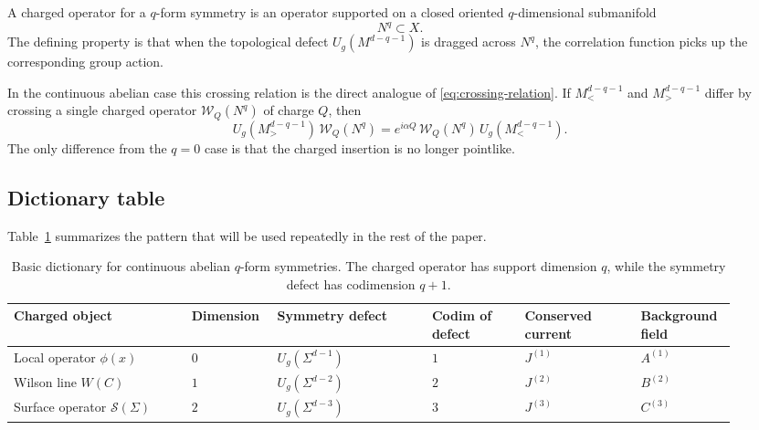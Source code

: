\begin{definition}\label{def:qdim-operator}
A charged operator for a $q$-form symmetry is an operator supported on a closed oriented $q$-dimensional submanifold
\begin{equation*}
N^q\subset X.
\end{equation*}
The defining property is that when the topological defect $U_g(M^{d-q-1})$ is dragged across $N^q$, the correlation function picks up the corresponding group action.
\end{definition}

\noindent In the continuous abelian case this crossing relation is the direct analogue of \eqref{eq:crossing-relation}. If $M_{<}^{d-q-1}$ and $M_{>}^{d-q-1}$ differ by crossing a single charged operator $\mathcal W_Q(N^q)$ of charge $Q$, then
\begin{equation}\label{eq:qform-crossing}
U_g(M_{>}^{d-q-1})\,\mathcal W_Q(N^q)
=
e^{i\alpha Q}\,\mathcal W_Q(N^q)\,U_g(M_{<}^{d-q-1}).
\end{equation}
The only difference from the $q=0$ case is that the charged insertion is no longer pointlike.

\subsection{Dictionary table}

Table~\ref{tab:qform-dictionary} summarizes the pattern that will be used repeatedly in the rest of the paper.

\begin{table}[h]
    \centering
    \small
    \begin{tabular}{@{}p{0.23\linewidth}p{0.10\linewidth}p{0.20\linewidth}p{0.12\linewidth}p{0.15\linewidth}p{0.12\linewidth}@{}}
        \toprule
        Charged object & Dimension & Symmetry defect & Codim of defect & Conserved current & Background field \\
        \midrule
        Local operator $\phi(x)$ & $0$ & $U_g(\Sigma^{d-1})$ & $1$ & $J^{(1)}$ & $A^{(1)}$ \\
        Wilson line $W(C)$ & $1$ & $U_g(\Sigma^{d-2})$ & $2$ & $J^{(2)}$ & $B^{(2)}$ \\
        Surface operator $\mathcal S(\Sigma)$ & $2$ & $U_g(\Sigma^{d-3})$ & $3$ & $J^{(3)}$ & $C^{(3)}$ \\
        \bottomrule
    \end{tabular}
    \caption{Basic dictionary for continuous abelian $q$-form symmetries. The charged operator has support dimension $q$, while the symmetry defect has codimension $q+1$.}
    \label{tab:qform-dictionary}
\end{table}

